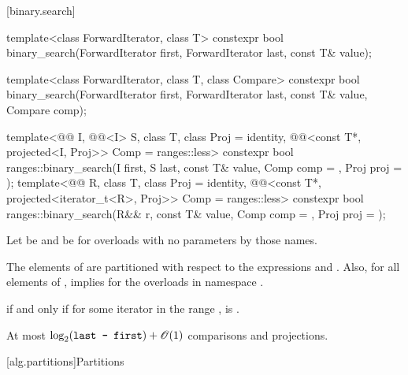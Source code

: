 [binary.search]{}

%
\begin{itemdecl}
template<class ForwardIterator, class T>
  constexpr bool
    binary_search(ForwardIterator first, ForwardIterator last,
                  const T& value);

template<class ForwardIterator, class T, class Compare>
  constexpr bool
    binary_search(ForwardIterator first, ForwardIterator last,
                  const T& value, Compare comp);

template<@@ I, @@<I> S, class T, class Proj = identity,
         @@<const T*, projected<I, Proj>> Comp = ranges::less>
  constexpr bool ranges::binary_search(I first, S last, const T& value, Comp comp = {},
                                       Proj proj = {});
template<@@ R, class T, class Proj = identity,
         @@<const T*, projected<iterator_t<R>, Proj>> Comp =
           ranges::less>
  constexpr bool ranges::binary_search(R&& r, const T& value, Comp comp = {},
                                       Proj proj = {});
\end{itemdecl}

\begin{itemdescr}
\pnum
Let  be  and
 be 
for overloads with no parameters by those names.

\pnum
\expects
The elements  of 
are partitioned with respect to the expressions
 and
.
Also, for all elements  of \tcode{[first, last)},
 implies 
for the overloads in namespace .

\pnum
\returns
{} if and only if
for some iterator  in the range ,
is .

\pnum
\complexity
At most $\log_2(\texttt{last - first}) + \mathscr{O}(1)$ comparisons and projections.
\end{itemdescr}

[alg.partitions]{Partitions}

